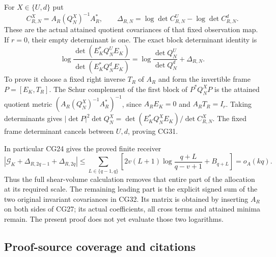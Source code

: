 \documentclass[11pt]{article}
\begin{document}
For \(X\in\{U,d\}\) put \[
C_{R,N}^X=A_R(Q_N^X)^{-1}A_R^*,\qquad
\Delta_{R,N}=\log\det C_{R,N}^U-\log\det C_{R,N}^d.
\] These are the actual attained quotient covariances of that fixed observation map. If \(r=0\), their empty determinant is one. The exact block determinant identity is \[
\boxed{\log\frac{\det(E_K^*Q_N^UE_K)}{\det(E_K^*Q_N^dE_K)}
=\log\frac{\det Q_N^U}{\det Q_N^d}+\Delta_{R,N}.}
\tag{CG31}
\] To prove it choose a fixed right inverse \(T_R\) of \(A_R\) and form the invertible frame \(P=[E_K,T_R]\). The Schur complement of the first block of \(P^*Q_N^XP\) is the attained quotient metric \((A_R(Q_N^X)^{-1}A_R^*)^{-1}\), since \(A_RE_K=0\) and \(A_RT_R=I_r\). Taking determinants gives \(|\det P|^2\det Q_N^X
=\det(E_K^*Q_N^XE_K)/\det C_{R,N}^X\). The fixed frame determinant cancels between \(U,d\), proving CG31.

In particular CG24 gives the proved finite receiver \[
\left|\mathcal G_K+
\Delta_{R,2q-1}+\Delta_{R,2q}\right|
\le\sum_{L\in\{q-1,q\}}
\left[2v(L+1)\log\frac{q+L}{q-v+1}+B_{q+L}\right]
=o_A(kq).
\tag{CG32}
\] Thus the full shear-volume calculation removes that entire part of the allocation at its required scale. The remaining leading part is the explicit signed sum of the two original invariant covariances in CG32. Its matrix is obtained by inserting \(A_R\) on both sides of CG27; its actual coefficients, all cross terms and attained minima remain. The present proof does not yet evaluate those two logarithms.

\subsection{Proof-source coverage and citations}\label{proof-source-coverage-and-citations}
\end{document}
